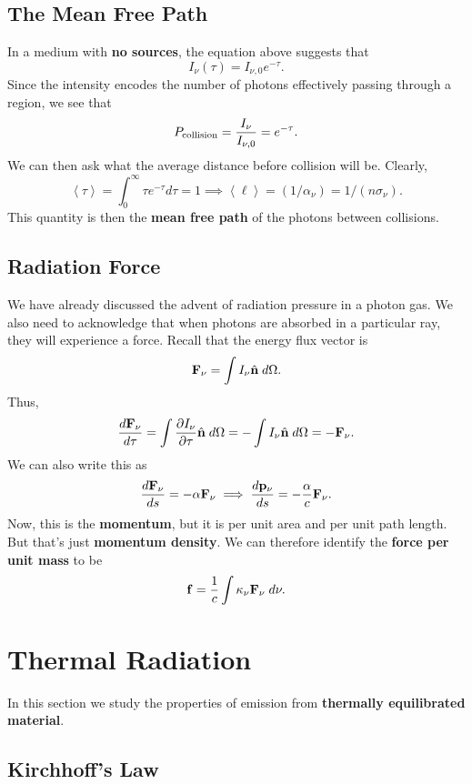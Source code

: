 \subsection{The Mean Free Path}

In a medium with \textbf{no sources}, the equation above suggests that
\[
I_\nu(\tau) = I_{\nu,0} e^{-\tau}.
\]
Since the intensity encodes the number of photons effectively passing through a region, we see that
\[
P_{\rm collision} = \frac{I_\nu}{I_{\nu,0}} = e^{-\tau}.
\]
We can then ask what the average distance before collision will be. Clearly,
\[
\left<\tau\right> = \int_0^\infty \tau e^{-\tau} d\tau = 1 \implies \left<\ell\right> = (1/\alpha_\nu) = 1/(n\sigma_\nu).
\]
This quantity is then the \textbf{mean free path} of the photons between collisions.

\subsection{Radiation Force}
We have already discussed the advent of radiation pressure in a photon gas. We also need to acknowledge that when photons are absorbed in a particular ray, they will experience a force. Recall that the energy flux vector is
\[
{\bf F}_\nu = \int I_\nu \hat{\bf n} \;d\Omega.
\]
Thus,
\[
\frac{d{\bf F}_\nu}{d\tau} = \int \frac{\partial I_\nu}{\partial \tau} \hat{\bf n}\; d\Omega = - \int I_\nu \hat{\bf n} \;d\Omega = -{\bf F}_\nu. 
\]
 We can also write this as 
\[
\frac{d{\bf F}_\nu}{ds} = -\alpha {\bf F_\nu} \implies \frac{d{\bf p}_\nu}{ds} = -\frac{\alpha}{c} {\bf F}_\nu.
\]
Now, this is the \textbf{momentum}, but it is per unit area and per unit path length. But that's just \textbf{momentum density}. We can therefore identify the \textbf{force per unit mass} to be
\[
{\bf f} = \frac{1}{c} \int \kappa_\nu {\bf F}_\nu \;d\nu.
\]

\section{Thermal Radiation}

In this section we study the properties of emission from \textbf{thermally equilibrated material}. 

\subsection{Kirchhoff's Law}


